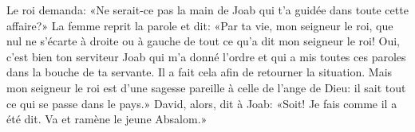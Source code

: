 Le roi demanda:
	«Ne serait-ce pas la main de Joab qui t’a guidée dans toute cette affaire?»
La femme reprit la parole et dit:
	«Par ta vie, mon seigneur le roi,
	que nul ne s’écarte à droite ou à gauche de tout ce qu’a dit mon seigneur le roi!
Oui, c’est bien ton serviteur Joab qui m’a donné l’ordre
	et qui a mis toutes ces paroles dans la bouche de ta servante.
Il a fait cela afin de retourner la situation.
Mais mon seigneur le roi est d’une sagesse pareille à celle de l’ange de Dieu:
	il sait tout ce qui se passe dans le pays.»
David, alors, dit à Joab:
	«Soit! Je fais comme il a été dit. Va et ramène le jeune Absalom.»
